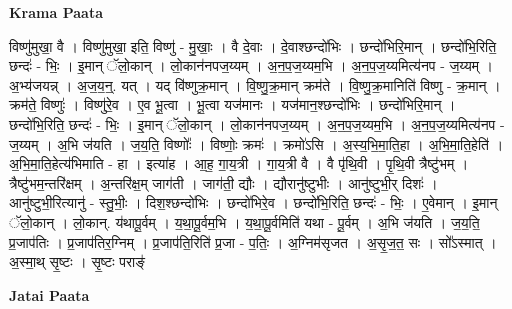 \documentclass[17pt]{extarticle}
\begin{document}
\textbf{Krama Paata} \newline

विष्णु॑मुखा॒ वै । विष्णु॑मुखा॒ इति॒ विष्णु॑ - मु॒खाः॒ । वै दे॒वाः । दे॒वाश्छन्दो॑भिः । छन्दो॑भिरि॒मान् । छन्दो॑भि॒रिति॒ छन्दः॑ - भिः॒ । इ॒मान् ॅलो॒कान् । लो॒कान॑नपज॒य्यम् । अ॒न॒प॒ज॒य्यम॒भि । अ॒न॒प॒ज॒य्यमित्य॑नप - ज॒य्यम् । अ॒भ्य॑जयन्न् । अ॒ज॒य॒न्॒. यत् । यद् वि॑ष्णुक्र॒मान् । वि॒ष्णु॒क्र॒मान् क्रम॑ते । वि॒ष्णु॒क्र॒मानिति॑ विष्णु - क्र॒मान् । क्रम॑ते॒ विष्णुः॑ । विष्णु॑रे॒व । ए॒व भू॒त्वा । भू॒त्वा यज॑मानः । यज॑मान॒श्छन्दो॑भिः । छन्दो॑भिरि॒मान् । छन्दो॑भि॒रिति॒ छन्दः॑ - भिः॒ । इ॒मान् ॅलो॒कान् । लो॒कान॑नपज॒य्यम् । अ॒न॒प॒ज॒य्यम॒भि । अ॒न॒प॒ज॒य्यमित्य॑नप - ज॒य्यम् । अ॒भि ज॑यति । ज॒य॒ति॒ विष्णोः᳚ । विष्णोः॒ क्रमः॑ । क्रमो॑ऽसि । अ॒स्य॒भि॒मा॒ति॒हा । अ॒भि॒मा॒ति॒हेति॑ । अ॒भि॒मा॒ति॒हेत्य॑भिमाति - हा । इत्या॑ह । आ॒ह॒ गा॒य॒त्री । गा॒य॒त्री वै । वै पृ॑थि॒वी । पृ॒थि॒वी त्रैष्टु॑भम् । त्रैष्टु॑भम॒न्तरि॑क्षम् । अ॒न्तरि॑क्ष॒म् जाग॑ती । जाग॑ती॒ द्यौः । द्यौरानु॑ष्टुभीः । आनु॑ष्टुभी॒र् दिशः॑ । आनु॑ष्टुभी॒रित्यानु॑ - स्तु॒भीः॒ । दिश॒श्छन्दो॑भिः । छन्दो॑भिरे॒व । छन्दो॑भि॒रिति॒ छन्दः॑ - भिः॒ । ए॒वेमान् । इ॒मान् ॅलो॒कान् । लो॒कान्. य॑थापू॒र्वम् । य॒था॒पू॒र्वम॒भि । य॒था॒पू॒र्वमिति॑ यथा - पू॒र्वम् । अ॒भि ज॑यति । ज॒य॒ति॒ प्र॒जाप॑तिः । प्र॒जाप॑तिर॒ग्निम् । प्र॒जाप॑ति॒रिति॑ प्र॒जा - प॒तिः॒ । अ॒ग्निम॑सृजत । अ॒सृ॒ज॒त॒ सः । सो᳚ऽस्मात् । अ॒स्मा॒थ् सृ॒ष्टः । सृ॒ष्टः पराङ्॑ \newline

\textbf{Jatai Paata} \newline
\end{document}

